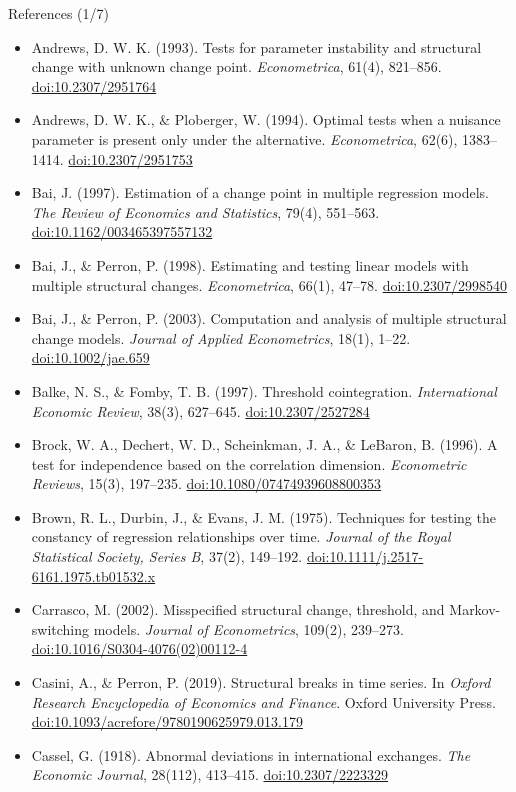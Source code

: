 \begin{frame}{References (1/7)}
\itemsize{\tiny}
\begin{itemize}
    \item Andrews, D. W. K. (1993). Tests for parameter instability and structural change with unknown change point. \textit{Econometrica}, 61(4), 821--856. \href{https://doi.org/10.2307/2951764}{doi:10.2307/2951764}
    \item Andrews, D. W. K., \& Ploberger, W. (1994). Optimal tests when a nuisance parameter is present only under the alternative. \textit{Econometrica}, 62(6), 1383--1414. \href{https://doi.org/10.2307/2951753}{doi:10.2307/2951753}
    \item Bai, J. (1997). Estimation of a change point in multiple regression models. \textit{The Review of Economics and Statistics}, 79(4), 551--563. \href{https://doi.org/10.1162/003465397557132}{doi:10.1162/003465397557132}
    \item Bai, J., \& Perron, P. (1998). Estimating and testing linear models with multiple structural changes. \textit{Econometrica}, 66(1), 47--78. \href{https://doi.org/10.2307/2998540}{doi:10.2307/2998540}
    \item Bai, J., \& Perron, P. (2003). Computation and analysis of multiple structural change models. \textit{Journal of Applied Econometrics}, 18(1), 1--22. \href{https://doi.org/10.1002/jae.659}{doi:10.1002/jae.659}
    \item Balke, N. S., \& Fomby, T. B. (1997). Threshold cointegration. \textit{International Economic Review}, 38(3), 627--645. \href{https://doi.org/10.2307/2527284}{doi:10.2307/2527284}
    \item Brock, W. A., Dechert, W. D., Scheinkman, J. A., \& LeBaron, B. (1996). A test for independence based on the correlation dimension. \textit{Econometric Reviews}, 15(3), 197--235. \href{https://doi.org/10.1080/07474939608800353}{doi:10.1080/07474939608800353}
    \item Brown, R. L., Durbin, J., \& Evans, J. M. (1975). Techniques for testing the constancy of regression relationships over time. \textit{Journal of the Royal Statistical Society, Series B}, 37(2), 149--192. \href{https://doi.org/10.1111/j.2517-6161.1975.tb01532.x}{doi:10.1111/j.2517-6161.1975.tb01532.x}
    \item Carrasco, M. (2002). Misspecified structural change, threshold, and Markov-switching models. \textit{Journal of Econometrics}, 109(2), 239--273. \href{https://doi.org/10.1016/S0304-4076(02)00112-4}{doi:10.1016/S0304-4076(02)00112-4}
    \item Casini, A., \& Perron, P. (2019). Structural breaks in time series. In \textit{Oxford Research Encyclopedia of Economics and Finance}. Oxford University Press. \href{https://doi.org/10.1093/acrefore/9780190625979.013.179}{doi:10.1093/acrefore/9780190625979.013.179}
    \item Cassel, G. (1918). Abnormal deviations in international exchanges. \textit{The Economic Journal}, 28(112), 413--415. \href{https://doi.org/10.2307/2223329}{doi:10.2307/2223329}
\end{itemize}
\end{frame}

